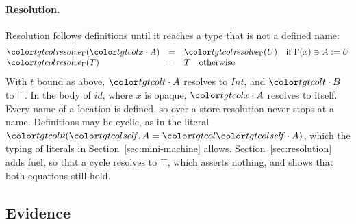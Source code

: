 \paragraph{Resolution.}
Resolution follows definitions until it reaches a type that is not a defined name:
\[
\begin{array}{@{}lcl@{}}
\resolve{\Gamma}{\sel{x}{A}} & = & \resolve{\Gamma}{U} \quad \text{if } \Gamma(x) \ni A \mathrel{:=} U \\
\resolve{\Gamma}{T} & = & T \quad \text{otherwise}
\end{array}
\]
With $t$ bound as above, $\sel{t}{A}$ resolves to $\mathit{Int}$, and $\sel{t}{B}$ to $\top$. In the body of $\mathit{id}$, where $x$ is opaque, $\sel{x}{A}$ resolves to itself. Every name of a location is defined, so over a store resolution never stops at a name. Definitions may be cyclic, as in the literal $\tgt{\nu(\self.\,A = \sel{\self}{A})}$, which the typing of literals in Section~\ref{sec:mini-machine} allows. Section~\ref{sec:resolution} adds fuel, so that a cycle resolves to $\top$, which asserts nothing, and shows that both equations still hold.

\FloatBarrier
\subsection{Evidence}\label{sec:mini-evidence}

